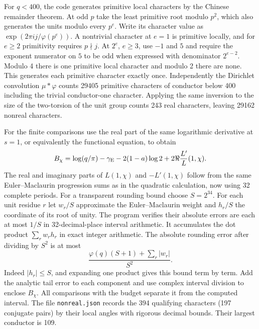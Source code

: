 \documentclass[11pt]{article}
\begin{document}
For $q<400$, the code generates primitive local characters by the Chinese
remainder theorem. At odd $p$ take the least primitive root modulo $p^2$,
which also generates the units modulo every $p^e$. Write its character
value as $\exp(2\pi i j/\varphi(p^e))$. A nontrivial character at $e=1$
is primitive locally, and for $e\ge2$ primitivity requires $p\nmid j$.
At $2^e$, $e\ge3$, use $-1$ and $5$ and require the exponent numerator
on $5$ to be odd when expressed with denominator $2^{e-2}$. Modulo 4
there is one primitive local character and modulo 2 there are none.
This generates each primitive character exactly once. Independently the
Dirichlet convolution $\mu*\varphi$ counts 29405 primitive characters
of conductor below 400 including the trivial conductor-one character.
Applying the same inversion to the size of the two-torsion of the
unit group counts 243 real characters, leaving 29162 nonreal characters.

For the finite comparisons use the real part of the same logarithmic
derivative at $s=1$, or equivalently the functional equation, to obtain
\[
 B_\chi=\log(q/\pi)-\gamma_{\rm E}-2(1-a)\log 2
       +2\Re\frac{L'}{L}(1,\chi).
\]
The real and imaginary parts of $L(1,\chi)$ and $-L'(1,\chi)$ follow from
the same Euler--Maclaurin progression sums as in the quadratic calculation,
now using 32 complete periods. For a transparent rounding bound choose
$S=2^{34}$. For each unit residue $r$ let $w_r/S$ approximate the
Euler--Maclaurin weight and $h_r/S$ the coordinate of its root of unity.
The program verifies their absolute errors are each at most $1/S$ in
32-decimal-place interval arithmetic. It accumulates the dot product
$\sum_r w_r h_r$ in exact integer arithmetic. The absolute rounding
error after dividing by $S^2$ is at most
\[
 \frac{\varphi(q)(S+1)+\sum_r |w_r|}{S^2}.
\]
Indeed $|h_r|\le S$, and expanding one product gives this bound term
by term. Add the analytic tail error to each component and use complex
interval division to enclose $B_\chi$. All comparisons with the budget
separate it from the computed interval. The file \texttt{nonreal.json}
records the 394 qualifying characters (197 conjugate pairs) by their
local angles with rigorous decimal bounds. Their largest conductor is 109.



\end{document}
